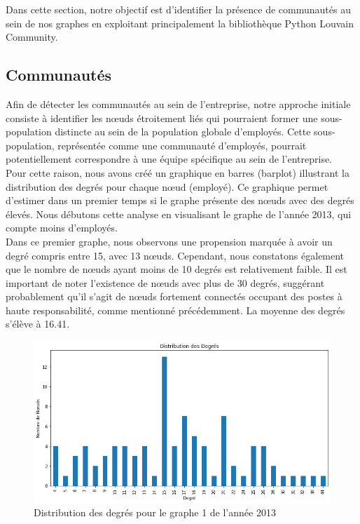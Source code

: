 \documentclass{article}
\begin{document}
Dans cette section, notre objectif est d'identifier la présence de communautés au sein de nos graphes en exploitant principalement la bibliothèque Python Louvain Community.

\subsection{Communautés}

Afin de détecter les communautés au sein de l'entreprise, notre approche initiale consiste à identifier les nœuds étroitement liés qui pourraient former une sous-population distincte au sein de la population globale d'employés. Cette sous-population, représentée comme une communauté d'employés, pourrait potentiellement correspondre à une équipe spécifique au sein de l'entreprise. \\

Pour cette raison, nous avons créé un graphique en barres (barplot) illustrant la distribution des degrés pour chaque nœud (employé). Ce graphique permet d'estimer dans un premier temps si le graphe présente des nœuds avec des degrés élevés. Nous débutons cette analyse en visualisant le graphe de l'année 2013, qui compte moins d'employés. \\

Dans ce premier graphe, nous observons une propension marquée à avoir un degré compris entre 15, avec 13 nœuds. Cependant, nous constatons également que le nombre de nœuds ayant moins de 10 degrés est relativement faible. Il est important de noter l'existence de nœuds avec plus de 30 degrés, suggérant probablement qu'il s'agit de nœuds fortement connectés occupant des postes à haute responsabilité, comme mentionné précédemment. La moyenne des degrés s'élève à 16.41.

\begin{figure}[!h]
    \centering
    \includegraphics[width=15cm]{assets/communaute/distribution_deg_2013}
    \caption{Distribution des degrés pour le graphe 1 de l'année 2013}
    \label{fig:distribution_deg_2013}
\end{figure}
\end{document}
